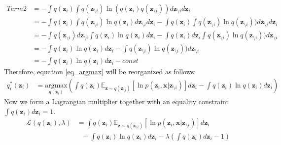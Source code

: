 \documentclass[a4]{article}
\begin{document}
\begin{equation}
\begin{aligned}
Term 2 &= - \int q(\mathbf{z}_i) \int q(\mathbf{z}_{\setminus i}) \ln ( q(\mathbf{z}_i)q(\mathbf{z}_{\setminus i}) ) d\mathbf{z}_{\setminus i} d\mathbf{z}_i\\
       &= - \int q(\mathbf{z}_i) \int q(\mathbf{z}_{\setminus i}) \ln q(\mathbf{z}_i) d\mathbf{z}_{\setminus i} d\mathbf{z}_i
          - \int q(\mathbf{z}_i) \int q(\mathbf{z}_{\setminus i}) \ln q(\mathbf{z}_{\setminus i}) ) d\mathbf{z}_{\setminus i} d\mathbf{z}_i\\
       &= - \int q(\mathbf{z}_{\setminus i}) d\mathbf{z}_{\setminus i} \int q(\mathbf{z}_i) \ln q(\mathbf{z}_i) d\mathbf{z}_i
          - \int q(\mathbf{z}_i) d\mathbf{z}_i \int q(\mathbf{z}_{\setminus i}) \ln q(\mathbf{z}_{\setminus i}) ) d\mathbf{z}_{\setminus i} \\
       &= - \int q(\mathbf{z}_i) \ln q(\mathbf{z}_i) d\mathbf{z}_i
          - \int q(\mathbf{z}_{\setminus i}) \ln q(\mathbf{z}_{\setminus i}) ) d\mathbf{z}_{\setminus i} \\
       &= - \int q(\mathbf{z}_i) \ln q(\mathbf{z}_i) d\mathbf{z}_i - const
\end{aligned}
\end{equation}
Therefore, equation \ref{eq_argmax} will be reorganized as follows:
\begin{equation}
\begin{aligned}
q^*_i(\mathbf{z}_i) &= \underset{q(\mathbf{z}_i)}{\mathrm{argmax}}(\int q(\mathbf{z}_i) \mathbb{E}_{\mathbf{z}\sim q(\mathbf{z}_{\setminus i})}[ \ln p(\mathbf{z}_i, \mathbf{x} | \mathbf{z}_{\setminus i}) ] d\mathbf{z}_i - \int q(\mathbf{z}_i) \ln q(\mathbf{z}_i) d\mathbf{z}_i)
\end{aligned}
\end{equation}
Now we form a Lagrangian multiplier together with an equality constraint $\int q(\mathbf{z}_i) d\mathbf{z}_i = 1$.
\begin{equation}
\begin{aligned}
\mathcal{L}( q(\mathbf{z}_i), \lambda ) &= \int q(\mathbf{z}_i) \mathbb{E}_{\mathbf{z}\sim q(\mathbf{z}_{\setminus i})}[ \ln p(\mathbf{z}_i, \mathbf{x} | \mathbf{z}_{\setminus i}) ] d\mathbf{z}_i\\
                                        &\:\:\: - \int q(\mathbf{z}_i) \ln q(\mathbf{z}_i) d\mathbf{z}_i - \lambda \left( \int q(\mathbf{z}_i)d\mathbf{z}_i - 1 \right)\\
\end{aligned}
\end{equation}
\end{document}
